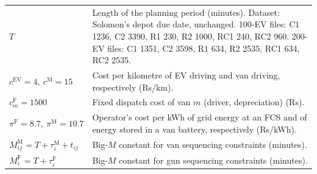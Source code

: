 \documentclass[12pt,a4paper]{article}
\begin{document}
{\begin{tabularx}{\textwidth}{@{}>{\raggedright\arraybackslash}p{4.6cm}X@{}}
$T$ & Length of the planning period (minutes). Dataset: Solomon's depot due date, unchanged. 100-EV files: C1 1236, C2 3390, R1 230, R2 1000, RC1 240, RC2 960. 200-EV files: C1 1351, C2 3598, R1 634, R2 2535, RC1 634, RC2 2535. \\[2pt]
$c^{\mathrm{EV}}=4,\ c^{\mathrm M}=15$ & Cost per kilometre of EV driving and van driving, respectively (Rs/km). \\[2pt]
$c^{\mathrm F}_m=1500$ & Fixed dispatch cost of van $m$ (driver, depreciation) (Rs). \\[2pt]
$\pi^{\mathrm F}=8.7,\ \pi^{\mathrm M}=10.7$ & Operator's cost per kWh of grid energy at an FCS and of energy stored in a van battery, respectively (Rs/kWh). \\[2pt]
$M^{\mathrm M}_{ij}=T+\tau^{\mathrm M}_i+t_{ij}$ & Big-$M$ constant for van sequencing constraints (minutes). \\[2pt]
$M^{\mathrm F}_i=T+\tau^{\mathrm F}_i$ & Big-$M$ constant for gun sequencing constraints (minutes). \\
\bottomrule
\end{tabularx}}

\newpage
\end{document}
